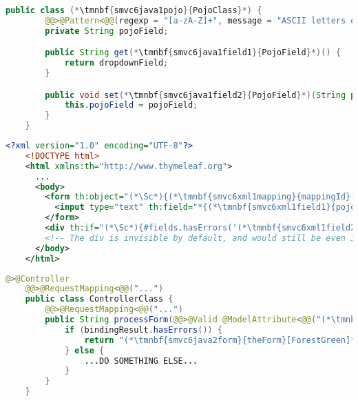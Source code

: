 \enlargethispage{10mm}
\thispagestyle{empty}
\begin{lstlisting}[language=Java, title={POJO class with restricted String field}]
    public class (*\tmnbf{smvc6java1pojo}{PojoClass}*) {
        @@>@Pattern<@@(regexp = "[a-zA-Z]+", message = "ASCII letters only")
        private String pojoField;

        public String get(*\tmnbf{smvc6java1field1}{PojoField}*)() {
            return dropdownField;
        }

        public void set(*\tmnbf{smvc6java1field2}{PojoField}*)(String pojoField) {
            this.pojoField = pojoField;
        }
    }
\end{lstlisting}
\begin{lstlisting}[language=XML, title={HTML form \tmnbf{smvc6xml1form}{\textit{theForm}}\textit{.html} setting the field}]
    <?xml version="1.0" encoding="UTF-8"?>
    <!DOCTYPE html>
    <html xmlns:th="http://www.thymeleaf.org">
      ...
      <body>
        <form th:object="(*\Sc*){(*\tmnbf{smvc6xml1mapping}{mappingId}[ForestGreen]*)}" ...>
          <input type="text" th:field="*{(*\tmnbf{smvc6xml1field1}{pojoField}[ForestGreen]*)}">
        </form>
        <div th:if="(*\Sc*){#fields.hasErrors('(*\tmnbf{smvc6xml1field2}{pojoField}[ForestGreen]*)')}" th:errors="*{(*\tmnbf{smvc6xml1field3}{pojoField}[ForestGreen]*)}"/>
        <!-- The div is invisible by default, and would still be even if it had some content -->
      </body>
    </html>
\end{lstlisting}
\begin{lstlisting}[language=Java, title={Controller processing the form}]
    @>@Controller
    @@>@RequestMapping<@@("...")
    public class ControllerClass {
        @@>@RequestMapping<@@("...")
        public String processForm(@@>@Valid @ModelAttribute<@@("(*\tmnbf{smvc6java2mapping}{mappingId}[ForestGreen]*)") (*\tmnbf{smvc6java2pojo}{PojoClass}*) pojo, BindingResult bindingResult) {
            if (bindingResult.hasErrors()) {
                return "(*\tmnbf{smvc6java2form}{theForm}[ForestGreen]*)";
            } else {
                ...DO SOMETHING ELSE...
            }
        }
    }
\end{lstlisting}
\newpage

